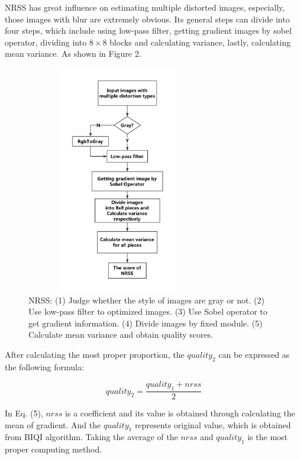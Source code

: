 NRSS has great influence on estimating multiple distorted images, especially, those images with blur are extremely obvious. Its general steps can divide into four steps, which include using low-pass filter, getting gradient images by sobel operator, dividing into $8\times8$ blocks and calculating variance, lastly, calculating mean variance. As shown in Figure 2.
\begin{figure}
\centering
\includegraphics[height=10cm, width=8cm]{images/NRSS.eps}
\caption{NRSS: (1) Judge whether the style of images are gray or not. (2) Use low-pass filter to optimized images. (3) Use Sobel operator to get gradient information. (4) Divide images by fixed module. (5) Calculate mean variance and obtain quality scores.} 
\label{2}
\end{figure}

After calculating the most proper proportion, the $quality_2$ can be expressed as the following formula:

\begin{equation}
quality_2=\frac{quality_1 + nrss}{2}
\end{equation}

In Eq. (5),  $nrss$ is a coefficient and its value is obtained through calculating the mean of gradient. And the $quality_1$ represents original value, which is obtained from BIQI algorithm. Taking the average of the $nrss$ and $quality_1$ is the most proper computing method. 

